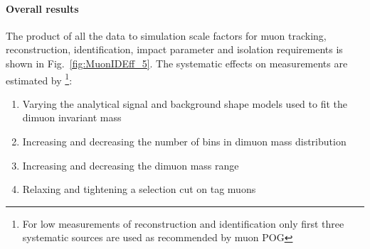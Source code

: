 
\paragraph*{Overall results}
The product of all the data to simulation scale factors for muon tracking, reconstruction, identification, impact parameter and isolation requirements is shown in Fig.~\ref{fig:MuonIDEff_5}. 
The systematic effects on measurements are estimated by \footnote{For low \pt measurements of reconstruction and identification only first three systematic sources are used as recommended by muon POG}:
\begin{enumerate}
        \item Varying the analytical signal and background shape models used to fit the dimuon invariant mass
        \item Increasing and decreasing the number of bins in dimuon mass distribution 
        \item Increasing and decreasing the dimuon mass range 
        \item Relaxing and tightening a selection cut on tag muons 
\end{enumerate}


